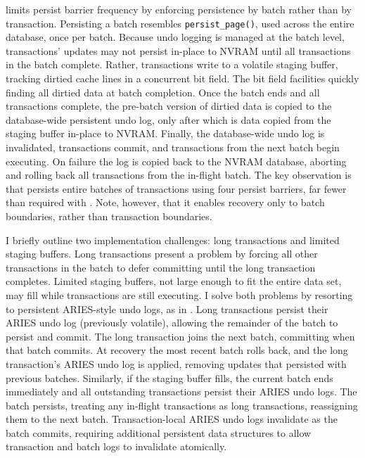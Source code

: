 \GroupCommit limits persist barrier frequen\-cy by enforcing persistence by batch rather than by transaction.
Persisting a batch resembles \texttt{persist\_page()}, used across the entire database, once per batch.
Because undo logging is managed at the batch level, transactions' updates may not persist in-place to NVRAM until all transactions in the batch complete.
Rather, transactions write to a volatile staging buffer, tracking dirtied cache lines in a concurrent bit field.
The bit field facilities quickly finding all dirtied data at batch completion.
Once the batch ends and all transactions complete, the pre-batch version of dirtied data is copied to the database-wide persistent undo log, only after which is data copied from the staging buffer in-place to NVRAM.
Finally, the database-wide undo log is invalidated, transactions commit, and transactions from the next batch begin executing.
On failure the log is copied back to the NVRAM database, aborting and rolling back all transactions from the in-flight batch.
The key observation is that \GroupCommit persists entire batches of transactions using four persist barriers, far fewer than required with \InPlace.  Note, however, that it enables recovery only to batch boundaries, rather than transaction boundaries.

I briefly outline two implementation challenges: long transactions and limited staging buffers.
Long transactions present a problem by forcing all other transactions in the batch to defer committing until the long transaction completes.
Limited staging buffers, not large enough to fit the entire data set, may fill while transactions are still executing.
I solve both problems by resorting to persistent ARIES-style undo logs, as in \InPlace.
Long transactions persist their ARIES undo log (previously volatile), allowing the remainder of the batch to persist and commit.
The long transaction joins the next batch, committing when that batch commits.
At recovery the most recent batch rolls back, and the long transaction's ARIES undo log is applied, removing updates that persisted with previous batches.
Similarly, if the staging buffer fills, the current batch ends immediately and all outstanding transactions persist their ARIES undo logs.
The batch persists, treating any in-flight transactions as long transactions, reassigning them to the next batch.
Transaction-local ARIES undo logs invalidate as the batch commits, requiring additional persistent data structures to allow transaction and batch logs to invalidate atomically.

